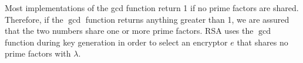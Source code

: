 Most implementations of the gcd function return 1 if no prime factors are shared.
Therefore, if the $\gcd$ function returns anything greater than 1,
we are assured that the two numbers share one or more prime factors.
RSA uses the $\gcd$ function during key generation
in order to select an encryptor $e$ that shares no prime factors with $\lambda$.



